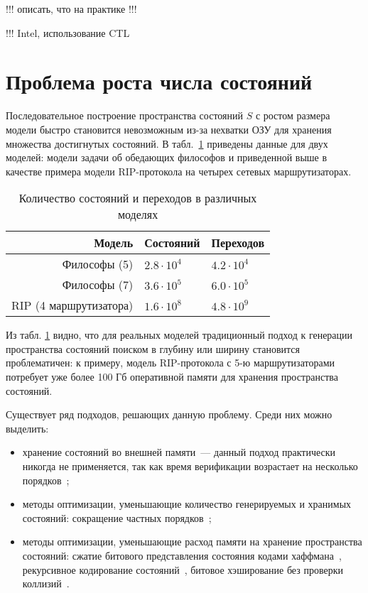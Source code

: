 \documentclass[a4paper,notitlepage,14pt]{article}
\begin{document}
!!! описать, что на практике !!!

!!! Intel, использование CTL

\section{Проблема роста числа состояний}
\label{sec:state-explosion}

Последовательное построение пространства состояний $S$ с ростом размера модели быстро
становится невозможным из-за нехватки ОЗУ для хранения множества достигнутых состояний. В
табл.~\ref{tab:models-statecount} приведены данные для двух моделей: модели задачи об
обедающих философов и приведенной выше в качестве примера модели RIP-протокола на четырех
сетевых маршрутизаторах.

\begin{table}
  \centering
  \begin{tabular}{|r|l|l|}
    \hline
    Модель                  & Состояний         & Переходов       \\
    \hline
    Философы (5)            & $2.8 \cdot 10^4$  & $4.2 \cdot 10^4$ \\
    Философы (7)            & $3.6 \cdot 10^5$  & $6.0 \cdot 10^5$ \\
    RIP (4 маршрутизатора)  & $1.6 \cdot 10^8$  & $4.8 \cdot 10^9$ \\
    \hline
  \end{tabular}
  \caption{Количество состояний и переходов в различных моделях}
\label{tab:models-statecount}
\end{table}

Из табл. \ref{tab:models-statecount} видно, что для реальных моделей традиционный подход к
генерации пространства состояний поиском в глубину или ширину становится проблематичен: к
примеру, модель RIP-протокола с 5-ю маршрутизаторами потребует уже более 100 Гб
оперативной памяти для хранения пространства состояний.

Существует ряд подходов, решающих данную проблему. Среди них можно выделить:

\begin{itemize}
\item хранение состояний во внешней памяти~--- данный подход практически никогда не
  применяется, так как время верификации возрастает на несколько порядков~\cite{Clarke};
\item методы оптимизации, уменьшающие количество генерируемых и хранимых состояний:
  сокращение частных порядков~\cite{POD};
\item методы оптимизации, уменьшающие расход памяти на хранение пространства состояний:
  сжатие битового представления состояния кодами хаффмана~\cite{StateCompr}, рекурсивное
  кодирование состояний~\cite{StateCompr}, битовое хэширование без проверки
  коллизий~\cite{BitHash1,Wolper}.
\end{itemize}
\end{document}
